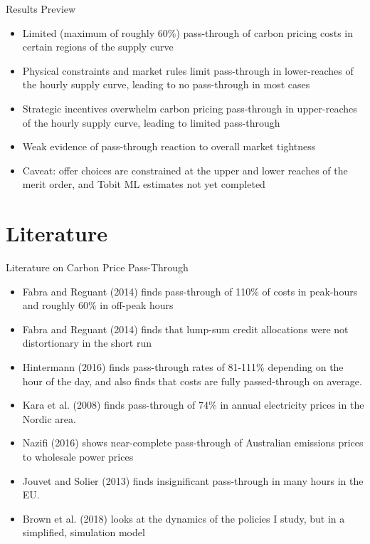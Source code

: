 \documentclass[aspectratio=169]{beamer}
\renewcommand{\(}{\begin{columns}}
\renewcommand{\)}{\end{columns}}
\newcommand{\<}[1]{\begin{column}{#1}}
\renewcommand{\>}{\end{column}}
\begin{document}
\begin{frame}{Results Preview}
    \begin{itemize}
    \item Limited (maximum of roughly 60\%) pass-through of carbon pricing costs in certain regions of the supply curve
    \item Physical constraints and market rules limit pass-through in lower-reaches of the hourly supply curve, leading to no pass-through in most cases
    \item Strategic incentives overwhelm carbon pricing pass-through in upper-reaches of the hourly supply curve, leading to limited pass-through
    \item Weak evidence of pass-through reaction to overall market tightness
    \item Caveat: offer choices are constrained at the upper and lower reaches of the merit order, and Tobit ML estimates not yet completed
        \end{itemize}
\vfill
\end{frame}

\section{Literature}

\begin{frame}{Literature on Carbon Price Pass-Through}
    \begin{itemize}
\item Fabra and Reguant (2014) finds pass-through of 110\% of costs in peak-hours and roughly 60\% in off-peak hours
\item Fabra and Reguant (2014) finds that lump-sum credit allocations were not distortionary in the short run
\item Hintermann (2016) finds pass-through rates of 81-111\% depending on the
hour of the day, and also finds that costs are fully passed-through on average. 
\item Kara et al. (2008) finds pass-through of 74\% in annual electricity prices in the Nordic area. 
\item Nazifi (2016) shows near-complete pass-through of Australian emissions prices to wholesale power prices
\item Jouvet and Solier (2013) finds insignificant pass-through in many hours in the EU.    
\item Brown et al. (2018) looks at the dynamics of the policies I study, but in a simplified, simulation model
\end{itemize}
\vfill
\end{frame}
\end{document}
